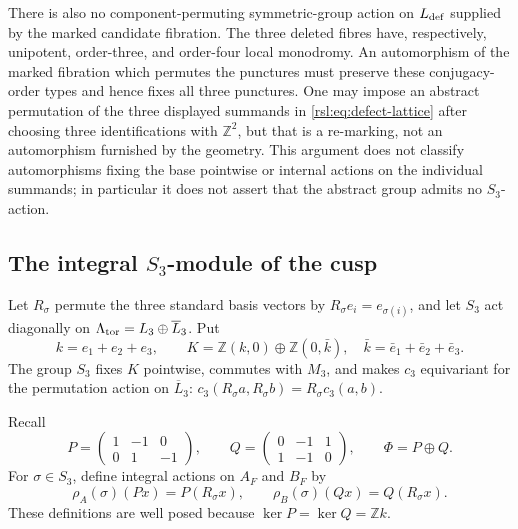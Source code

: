 There is also no component-permuting symmetric-group action on
\(L_{\rm def}\) supplied by the marked candidate fibration.  The three
deleted fibres have, respectively,
unipotent, order-three, and order-four local monodromy.  An automorphism of
the marked fibration which permutes the punctures must preserve these
conjugacy-order types and hence fixes all three punctures.  One may impose an
abstract permutation of the three displayed summands in
\eqref{rsl:eq:defect-lattice} after choosing three identifications with
\(\mathbb Z^2\), but that is a re-marking, not an automorphism furnished by
the geometry.  This argument does not classify automorphisms fixing the base
pointwise or internal actions on the individual summands; in particular it
does not assert that the abstract group admits no \(S_3\)-action.

\subsection{The integral \texorpdfstring{\(S_3\)}{S3}-module of the cusp}
\label{rsl:subsec:s3-module}

Let \(R_\sigma\) permute the three standard basis vectors by
\(R_\sigma e_i=e_{\sigma(i)}\), and let \(S_3\) act diagonally on
\(\Lambda_{\rm tor}=L_3\oplus\overline L_3\).  Put
\begin{equation}
 k=e_1+e_2+e_3,
 \qquad
 K=\mathbb Z(k,0)\oplus\mathbb Z(0,\bar k),
 \quad \bar k=\bar e_1+\bar e_2+\bar e_3.
 \label{rsl:eq:kernel-k}
\end{equation}
The group \(S_3\) fixes \(K\) pointwise, commutes with \(M_3\), and makes
\(c_3\) equivariant for the permutation action on \(\overline L_3\):
\(c_3(R_\sigma a,R_\sigma b)=R_\sigma c_3(a,b)\).

Recall
\begin{equation}
 P=\begin{pmatrix}1&-1&0\\0&1&-1\end{pmatrix},
 \qquad
 Q=\begin{pmatrix}0&-1&1\\1&-1&0\end{pmatrix},
 \qquad
 \Phi=P\oplus Q.
 \label{rsl:eq:PQ}
\end{equation}
For \(\sigma\in S_3\), define integral actions on \(A_F\) and \(B_F\) by
\begin{equation}
 \rho_A(\sigma)(Px)=P(R_\sigma x),
 \qquad
 \rho_B(\sigma)(Qx)=Q(R_\sigma x).
 \label{rsl:eq:target-actions}
\end{equation}
These definitions are well posed because
\(\ker P=\ker Q=\mathbb Zk\).

